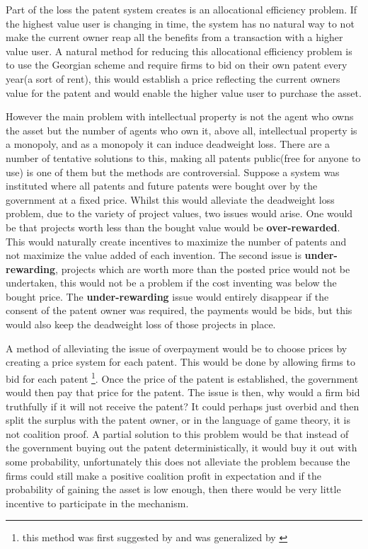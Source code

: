 \documentclass[12pt]{article}
\numberwithin{equation}{section}
\begin{document}
Part of the loss the patent system creates is an allocational efficiency problem. If the highest value user is changing in time, the system has no natural way to not make the current owner reap all the benefits from a transaction with a higher value user. A natural method for reducing this allocational efficiency problem is to use the Georgian scheme and require firms to bid on their own patent every year(a sort of rent), this would establish a price reflecting the current owners value for the patent and would enable the higher value user to purchase the asset.

However the main problem with intellectual property is not the agent who owns the asset but the number of agents who own it, above all, intellectual property is a monopoly, and as a monopoly it can induce deadweight loss. There are a number of tentative solutions to this, making all patents public(free for anyone to use) is one of them but the methods are controversial. Suppose a system was instituted where all patents and future patents were bought over by the government at a fixed price. Whilst this would alleviate the deadweight loss problem, due to the variety of project values, two issues would arise. One would be that projects worth less than the bought value would be \textbf{over-rewarded}. This would naturally create incentives to maximize the number of patents and not maximize the value added of each invention. The second issue is \textbf{under-rewarding}, projects which are worth more than the posted price would not be undertaken, this would not be a problem if the cost inventing was below the bought price. The \textbf{under-rewarding} issue would entirely disappear if the consent of the patent owner was required, the payments would be bids, but this would also keep the deadweight loss of those projects in place.


A method of alleviating the issue of overpayment would be to choose prices by creating a price system for each patent. This would be done by allowing firms to bid for each patent \footnote{this method was first suggested by\cite{kremer_1998} and was generalized by \cite{weyl2012market}}. Once the price of the patent is established, the government would then pay that price for the patent. The issue is then, why would a firm bid truthfully if it will not receive the patent? It could perhaps just overbid and then split the surplus with the patent owner, or in the language of game theory, it is not coalition proof. A partial solution to this problem would be that instead of the government buying out the patent deterministically, it would buy it out with some probability, unfortunately this does not alleviate the problem because the firms could still make a positive coalition profit in expectation and if the probability of gaining the asset is low enough, then there would be very little incentive to participate in the mechanism.
\end{document}
